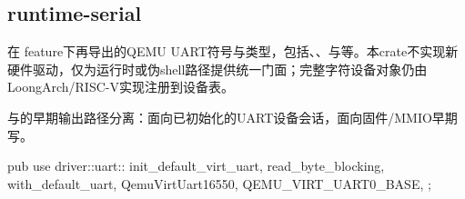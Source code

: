 
\subsection{runtime-serial}

在 feature下再导出的QEMU UART符号与类型，包括、、与等。本crate不实现新硬件驱动，仅为运行时或伪shell路径提供统一门面；完整字符设备对象仍由 LoongArch/RISC-V实现注册到设备表。

与的早期输出路径分离：面向已初始化的UART设备会话，面向固件/MMIO早期写。

\begin{rustcode}
pub use driver::uart::{
    init_default_virt_uart, read_byte_blocking, with_default_uart,
    QemuVirtUart16550, QEMU_VIRT_UART0_BASE,
};
\end{rustcode}

